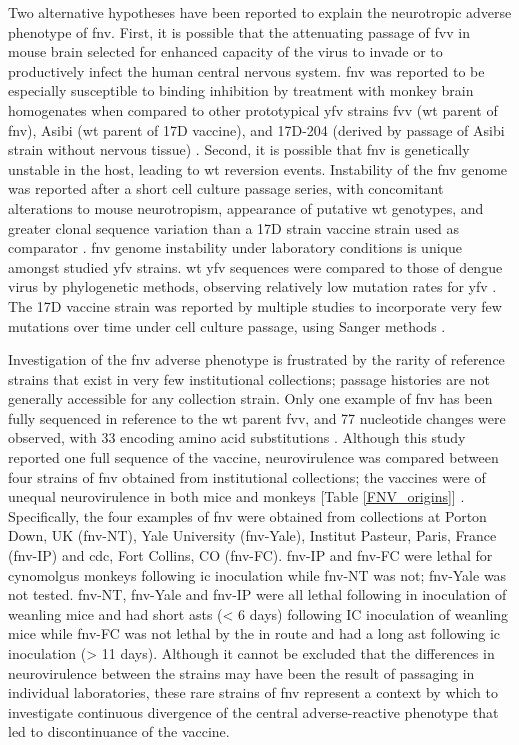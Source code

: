 Two alternative hypotheses have been reported to explain the neurotropic adverse phenotype of \gls{fnv}. First, it is possible that the attenuating passage of \gls{fvv} in mouse brain selected for enhanced capacity of the virus to invade or to productively infect the human central nervous system. \Gls{fnv} was reported to be especially susceptible to binding inhibition by treatment with monkey brain homogenates when compared to other prototypical \gls{yfv} strains \gls{fvv} (\gls{wt} parent of \gls{fnv}), Asibi (\gls{wt} parent of 17D vaccine), and 17D-204 (derived by passage of Asibi strain without nervous tissue) \parencite{Ni:2000un}. Second, it is possible that \gls{fnv} is genetically unstable in the host, leading to \gls{wt} reversion events. Instability of the \gls{fnv} genome was reported after a short cell culture passage series, with concomitant alterations to mouse neurotropism, appearance of putative \gls{wt} genotypes, and greater clonal sequence variation than a 17D strain vaccine strain used as comparator \parencite{Holbrook:2000ut}. \gls{fnv} genome instability under laboratory conditions is unique amongst studied \gls{yfv} strains. \Gls{wt} \gls{yfv} sequences were compared to those of dengue virus by phylogenetic methods, observing relatively low mutation rates for \gls{yfv} \parencite{Sall:2010db}. The 17D vaccine strain was reported by multiple studies to incorporate very few mutations over time under cell culture passage, using Sanger methods \parencite{Xie:1998wi, Pugachev:2003fj}. 

Investigation of the \gls{fnv} adverse phenotype is frustrated by the rarity of reference strains that exist in very few institutional collections; passage histories are not generally accessible for any collection strain. Only one example of \gls{fnv} has been fully sequenced in reference to the \gls{wt} parent \gls{fvv}, and 77 nucleotide changes were observed, with 33 encoding amino acid substitutions \parencite{Wang:1995vu}. Although this study reported one full sequence of the vaccine, neurovirulence was compared between four strains of \gls{fnv} obtained from institutional collections; the vaccines were of unequal neurovirulence in both mice and monkeys [Table \ref{FNV_origins}] \parencite{Wang:1995vu}. Specifically, the four examples of \gls{fnv} were obtained from collections at Porton Down, UK (\gls{fnv}-NT), Yale University (\gls{fnv}-Yale), Institut Pasteur, Paris, France (\gls{fnv}-IP) and \gls{cdc}, Fort Collins, CO (\gls{fnv}-FC). \gls{fnv}-IP and \gls{fnv}-FC were lethal for cynomolgus monkeys following \gls{ic} inoculation while \gls{fnv}-NT was not; \gls{fnv}-Yale was not tested. \Gls{fnv}-NT, \gls{fnv}-Yale and \gls{fnv}-IP were all lethal following \gls{in} inoculation of weanling mice and had short \glspl{ast} (< 6 days) following IC inoculation of weanling mice while \gls{fnv}-FC was not lethal by the \gls{in} route and had a long \gls{ast} following \gls{ic} inoculation (> 11 days). Although it cannot be excluded that the differences in neurovirulence between the strains may have been the result of passaging in individual laboratories, these rare strains of \gls{fnv} represent a context by which to investigate continuous divergence of the central adverse-reactive phenotype that led to discontinuance of the vaccine. 

